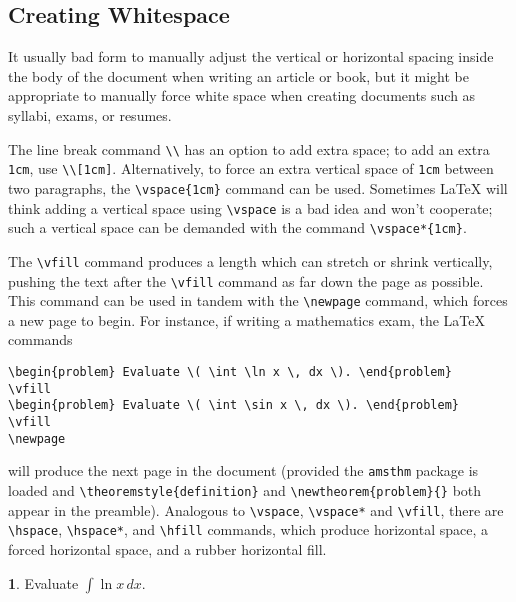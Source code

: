\documentclass[11pt]{article}
\theoremstyle{definition}
\newtheorem{problem}{}
\begin{document}
\subsection{Creating Whitespace}

It usually bad form to manually adjust the vertical or horizontal spacing inside the
body of the document when writing an article or book, but it might be appropriate to
manually force white space when creating documents such as syllabi, exams, or resumes.

The line break command \verb~\\~ has an option to add extra space; to add an
extra \verb~1cm~, use \verb~\\[1cm]~.  Alternatively, to force an extra vertical space
of \verb~1cm~ between two paragraphs, the \verb~\vspace{1cm}~ command can be used.
Sometimes \LaTeX{} will think adding a vertical space using \verb~\vspace~ is a bad
idea and won't cooperate; such a vertical space can be demanded with the
command \verb~\vspace*{1cm}~.

The \verb~\vfill~ command produces a length which can stretch or shrink vertically,
pushing the text after the \verb~\vfill~ command as far down the page as possible.
This command can be used in tandem with the \verb~\newpage~ command, which forces a
new page to begin.  For instance, if writing a mathematics exam, the \LaTeX{} commands
\begin{verbatim}
\begin{problem} Evaluate \( \int \ln x \, dx \). \end{problem}
\vfill
\begin{problem} Evaluate \( \int \sin x \, dx \). \end{problem}
\vfill
\newpage
\end{verbatim}
will produce the next page in the document (provided the \verb~amsthm~ package
is loaded and \verb~\theoremstyle{definition}~ and
\verb~\newtheorem{problem}{}~ both appear in the preamble).  Analogous to
\verb~\vspace~, \verb~\vspace*~ and \verb~\vfill~, there are \verb~\hspace~,
\verb~\hspace*~, and \verb~\hfill~ commands, which produce horizontal space, a
forced horizontal space, and a rubber horizontal fill.

\newpage

\begin{problem}
  Evaluate \(\displaystyle \int \ln x \, dx \).
\end{problem}
\end{document}
